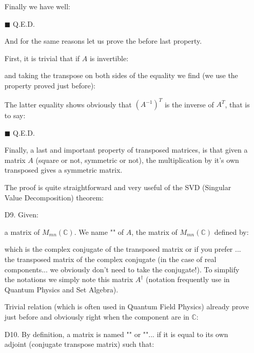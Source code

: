 \begin{enumerate}
\begin{dem}
		Finally we have well:
		
		\begin{flushright}
			$\blacksquare$  Q.E.D.
		\end{flushright}
		\end{dem}
		And for the same reasons let us prove the before last property.
		\begin{dem}
		First, it is trivial that if $A$ is invertible:
		
		and taking the transpose on both sides of the equality we find (we use the property proved just before):
		
		The latter equality shows obviously that $(A^{-1})^T$ is the inverse of $A^T$, that is to say:
		
		\begin{flushright}
			$\blacksquare$  Q.E.D.
		\end{flushright}
		\end{dem}
		Finally, a last and important property of transposed matrices, is that given a matrix $A$ (square or not, symmetric or not), the multiplication by it's own transposed gives a symmetric matrix. 
		
		The proof is quite straightforward and very useful of the SVD (Singular Value Decomposition) theorem:
		
		
		\item[D9.] Given:
		
		a matrix of $M_{mn}(\mathbb{C})$. We name "\label{adjoint matrix}" of $A$, the matrix of $M_{mn}(\mathbb{C})$ defined by:
		
		which is the complex conjugate of the transposed matrix or if you prefer ... the transposed matrix of the complex conjugate (in the case of real components... we obviously don't need to take the conjugate!). To simplify the notations we simply note this matrix $A^\dagger$ (notation frequently use in Quantum Physics and Set Algebra).
		\begin{tcolorbox}[title=Remark,colframe=black,arc=10pt]
		Trivial relation (which is often used in Quantum Field Physics) already prove just before and obviously right when the component are in $\mathbb{C}$:
		
		\end{tcolorbox}
		
		\item[D10.] By definition, a matrix is named "" or "\label{self-ajdoint matrix}"... if it is equal to its own adjoint (conjugate transpose matrix) such that:
		

\end{enumerate}
